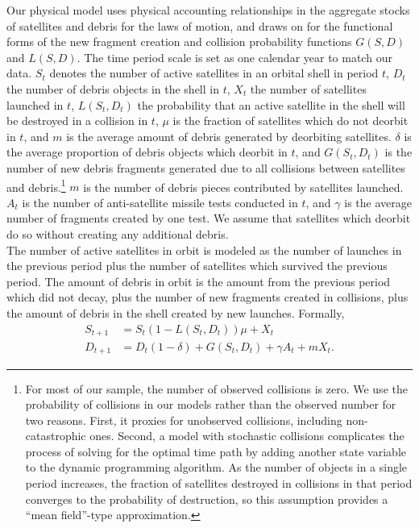 \documentclass[12pt]{article}
\begin{document}
Our physical model uses physical accounting relationships in the aggregate stocks of satellites and debris for the laws of motion, and draws on \citep{letiziaetal2017} for the functional forms of the new fragment creation and collision probability functions $G(S,D)$ and $L(S,D)$. The time period scale is set as one calendar year to match our data. $S_t$ denotes the number of active satellites in an orbital shell in period $t$, $D_t$ the number of debris objects in the shell in $t$, $X_t$ the number of satellites launched in $t$, $L(S_t,D_t)$ the probability that an active satellite in the shell will be destroyed in a collision in $t$, $\mu$ is the fraction of satellites which do not deorbit in $t$, and $m$ is the average amount of debris generated by deorbiting satellites. $\delta$ is the average proportion of debris objects which deorbit in $t$, and $G(S_t,D_t)$ is the number of new debris fragments generated due to all collisions between satellites and debris.\footnote{For most of our sample, the number of observed collisions is zero. We use the probability of collisions in our models rather than the observed number for two reasons. First, it proxies for unobserved collisions, including non-catastrophic ones. Second, a model with stochastic collisions complicates the process of solving for the optimal time path by adding another state variable to the dynamic programming algorithm. As the number of objects in a single period increases, the fraction of satellites destroyed in collisions in that period converges to the probability of destruction, so this assumption provides a ``mean field''-type approximation.} $m$ is the number of debris pieces contributed by satellites launched. $A_t$ is the number of anti-satellite missile tests conducted in $t$, and $\gamma$ is the average number of fragments created by one test. We assume that satellites which deorbit do so without creating any additional debris. \\

The number of active satellites in orbit is modeled as the number of launches in the previous period plus the number of satellites which survived the previous period. The amount of debris in orbit is the amount from the previous period which did not decay, plus the number of new fragments created in collisions, plus the amount of debris in the shell created by new launches. Formally,
\begin{align}
\label{satelliteLoM}
S_{t+1} &= S_t(1 - L(S_t,D_t))\mu + X_t \\
\label{debrisLoM}
D_{t+1} &= D_t(1-\delta) + G(S_t,D_t) + \gamma A_t + mX_t.
\end{align}
\end{document}
